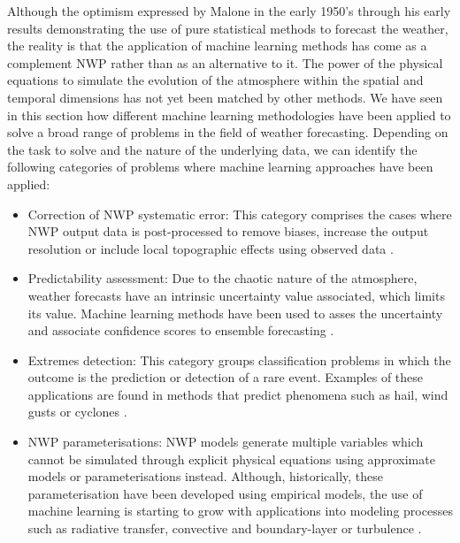 \medskip

Although the optimism expressed by Malone in the early 1950's \citep{malone1955application} through his early results demonstrating the use of pure statistical methods to forecast the weather, the reality is that the application of machine learning methods has come as a complement NWP rather than as an alternative to it. The power of the physical equations to simulate the evolution of the atmosphere within the spatial and temporal dimensions has not yet been matched by other methods. We have seen in this section how different machine learning methodologies have been applied to solve a broad range of problems in the field of weather forecasting. Depending on the task to solve and the nature of the underlying data, we can identify the following categories of problems where machine learning approaches have been applied:

\medskip

\begin{itemize}
  \item Correction of NWP systematic error: This category comprises the cases where NWP output data is post-processed to remove biases, increase the output resolution or include local topographic effects using observed data \citep{aznarte2017dynamic,buehner2010intercomparison}.
  \item Predictability assessment: Due to the chaotic nature of the atmosphere, weather forecasts have an intrinsic uncertainty value associated, which limits its value. Machine learning methods have been used to asses the uncertainty and associate confidence scores to ensemble forecasting \citep{wilks2002smoothing,foley2012current,mallet2009ozone}.
  \item Extremes detection: This category groups classification problems in which the outcome is the prediction or detection of a rare event. Examples of these applications are found in methods that predict phenomena such as hail, wind gusts or cyclones \citep{mcgovern2017using,williams2008remote,herman2018money}.
  \item NWP parameterisations: NWP models generate multiple variables which cannot be simulated through explicit physical equations using approximate models or parameterisations instead. Although, historically, these parameterisation have been developed using empirical models, the use of machine learning is starting to grow with applications into modeling processes such as radiative transfer, convective and boundary-layer or turbulence \citep{szturc2007parameterisation,o2018using,gentine2018could}.
\end{itemize}


